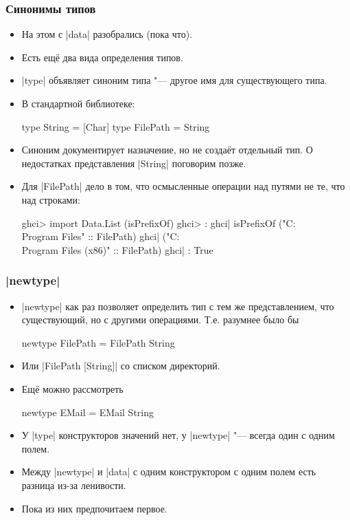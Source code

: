 \documentclass[10pt]{beamer}
\begin{document}
\begin{frame}[fragile]
  \frametitle{Синонимы типов}
  \begin{itemize}
    \item На этом с \haskinline|data| разобрались (пока что).
          \pause
    \item Есть ещё два вида определения типов.
    \item \haskinline|type| объявляет синоним типа "--- другое имя для существующего типа.
    \item В стандартной библиотеке:
          \begin{haskell}
            type String = [Char]
            type FilePath = String
          \end{haskell}
    \item Синоним документирует назначение, но не создаёт отдельный тип. О недостатках представления \haskinline|String| поговорим позже.
          \pause
    \item Для \haskinline|FilePath| дело в том, что осмысленные операции над путями не те, что над строками:
          \begin{haskell}
            ghci> import Data.List (isPrefixOf)
            ghci> :{
            ghci| isPrefixOf ("C:\\Program Files" :: FilePath)
            ghci|            ("C:\\Program Files (x86)" :: FilePath)
            ghci| :}
            True
          \end{haskell}
  \end{itemize}
\end{frame}

\begin{frame}[fragile]
  \frametitle{\haskinline|newtype|}
  \begin{itemize}
    \item \haskinline|newtype| как раз позволяет определить тип с тем же представлением, что существующий, но с другими операциями. Т.е. разумнее было бы
          \begin{haskell}
            newtype FilePath = FilePath String
          \end{haskell}
    \item Или \haskinline|FilePath [String]| со списком директорий.
    \item Ещё можно рассмотреть
          \begin{haskell}
            newtype EMail = EMail String
          \end{haskell}
    \item У \haskinline|type| конструкторов значений нет, у \haskinline|newtype| "--- всегда один с одним полем.
    \item Между \haskinline|newtype| и \haskinline|data| с одним конструктором с одним полем есть разница из-за ленивости.
    \item Пока из них предпочитаем первое.
  \end{itemize}
\end{frame}
\end{document}
